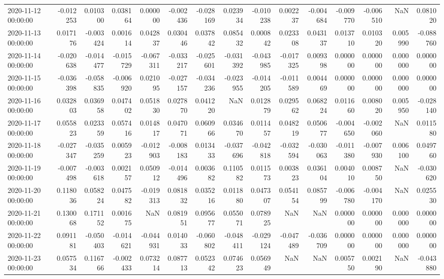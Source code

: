 \begin{tabular}{lrrrrrrrrrrrrrr}
2020-11-12 00:00:00 & -0.012253 & 0.010300 & 0.038164 & 0.000000 & -0.002436 & -0.028169 & 0.023934 & -0.010238 & 0.002237 & -0.004684 & -0.009770 & -0.006510 & NaN & 0.081020 \\
2020-11-13 00:00:00 & 0.017176 & -0.003424 & 0.001614 & 0.042837 & 0.030446 & 0.037842 & 0.085432 & 0.000842 & 0.023308 & 0.043137 & 0.013710 & 0.010320 & 0.005990 & -0.088760 \\
2020-11-14 00:00:00 & -0.020638 & -0.014477 & -0.015729 & -0.067311 & -0.033217 & -0.025601 & -0.031392 & -0.043985 & -0.017325 & 0.009398 & 0.000000 & 0.000000 & 0.000000 & 0.000000 \\
2020-11-15 00:00:00 & -0.036398 & -0.058835 & -0.006920 & 0.021095 & -0.027157 & -0.034236 & -0.023955 & -0.014205 & -0.011589 & 0.004469 & 0.000000 & 0.000000 & 0.000000 & 0.000000 \\
2020-11-16 00:00:00 & 0.032803 & 0.036958 & 0.047402 & 0.051830 & 0.027870 & 0.041220 & NaN & 0.012879 & 0.029562 & 0.068224 & 0.011660 & 0.008020 & 0.005950 & -0.028140 \\
2020-11-17 00:00:00 & 0.055823 & 0.023359 & 0.057416 & 0.014817 & 0.047071 & 0.060966 & 0.034670 & 0.011457 & 0.048219 & 0.050677 & -0.004650 & -0.002060 & NaN & 0.011580 \\
2020-11-18 00:00:00 & -0.027347 & -0.035259 & 0.005923 & -0.012903 & -0.008183 & 0.013433 & -0.037696 & -0.042818 & -0.032594 & -0.030063 & -0.011380 & -0.007930 & 0.006100 & 0.049760 \\
2020-11-19 00:00:00 & -0.007498 & -0.003618 & 0.002157 & 0.050912 & -0.014496 & 0.003682 & 0.110582 & 0.011573 & 0.003823 & 0.036104 & 0.004010 & 0.008750 & NaN & -0.030620 \\
2020-11-20 00:00:00 & 0.118036 & 0.058224 & 0.047582 & -0.019313 & 0.081832 & 0.035216 & 0.011880 & 0.047307 & 0.054154 & 0.085799 & -0.006780 & -0.004170 & NaN & 0.025530 \\
2020-11-21 00:00:00 & 0.130068 & 0.171152 & 0.001675 & NaN & 0.081951 & 0.095677 & 0.055071 & 0.078925 & NaN & NaN & 0.000000 & 0.000000 & 0.000000 & 0.000000 \\
2020-11-22 00:00:00 & 0.091181 & -0.050403 & -0.014621 & -0.044931 & 0.014033 & -0.060802 & -0.048411 & -0.029124 & -0.047489 & -0.036709 & 0.000000 & 0.000000 & 0.000000 & 0.000000 \\
2020-11-23 00:00:00 & 0.057534 & 0.116766 & -0.002433 & 0.073214 & 0.087713 & 0.052342 & 0.074623 & 0.056949 & NaN & NaN & 0.005750 & 0.002190 & NaN & -0.043880 \\

\end{tabular}
